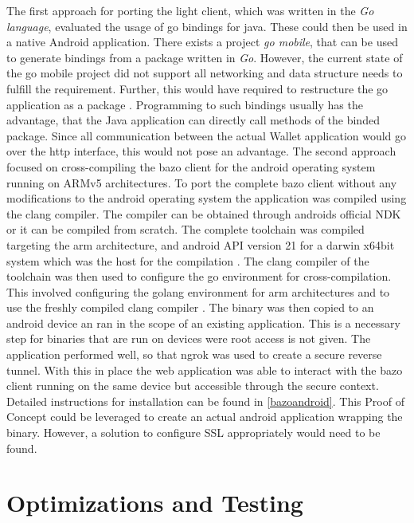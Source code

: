 The first approach for porting the light client, which was written in the \textit{Go language}, evaluated the usage of go bindings for java. These could then be used in a native Android application. There exists a project \textit{go mobile}, that can be used to generate bindings from a package written in \textit{Go}. However, the current state of the go mobile project did not support all networking and data structure needs to fulfill the requirement. Further, this would have required to restructure the go application as a package \cite{gobind}. Programming to such bindings usually has the advantage, that the Java application can directly call methods of the binded package. Since all communication between the actual Wallet application would go over the http interface, this would not pose an advantage.
The second approach focused on cross-compiling the bazo client for the android operating system running on ARMv5 architectures.
To port the complete bazo client without any modifications to the android operating system the application was compiled using the clang compiler. The compiler can be obtained through androids official NDK or it can be compiled from scratch. The complete toolchain was compiled targeting the arm architecture, and android API version 21 for a darwin x64bit system which was the host for the compilation \cite{standalonetoolchain}. The clang compiler of the toolchain was then used to configure the go environment for cross-compilation. This involved configuring the golang environment for arm architectures and to use the freshly compiled clang compiler \cite{gobuild}.
The binary was then copied to an android device an ran in the scope of an existing application. This is a necessary step for binaries that are run on devices were root access is not given. The application performed well, so that ngrok was used to create a secure reverse tunnel. With this in place the web application was able to interact with the bazo client running on the same device but accessible through the secure context. Detailed instructions for installation can be found in \ref{bazoandroid}.
This Proof of Concept could be leveraged to create an actual android application wrapping the binary. However, a solution to configure SSL appropriately would need to be found.

\section{Optimizations and Testing}

\newpage
